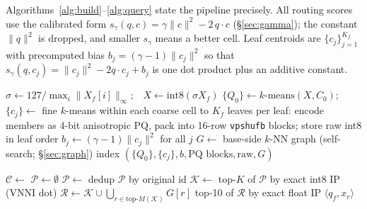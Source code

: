 \documentclass{article}
\begin{document}
Algorithms~\ref{alg:build}--\ref{alg:query} state the pipeline precisely. All
routing scores use the calibrated form $s_\gamma(q,c)=\gamma\lVert c\rVert^2-2\,
q\!\cdot\!c$ (\S\ref{sec:gamma}); the constant $\lVert q\rVert^2$ is dropped, and
smaller $s_\gamma$ means a better cell. Leaf centroids are $\{c_j\}_{j=1}^{K_f}$
with precomputed bias $b_j=(\gamma-1)\lVert c_j\rVert^2$ so that
$s_\gamma(q,c_j)=\lVert c_j\rVert^2-2q\!\cdot\!c_j+b_j$ is one dot product plus an
additive constant.

\begin{algorithm}[t]
\caption{Build}
\label{alg:build}
$\sigma \gets 127/\max_i\lVert X_f[i]\rVert_\infty$;\ \ $X \gets \mathrm{int8}(\sigma X_f)$
$\{Q_0\}\gets k\text{-means}(X,C_0)$;\ \ $\{c_j\}\gets$ fine $k$-means within each
  coarse cell to $K_f$ leaves\;
per leaf: encode members as 4-bit anisotropic PQ, pack into 16-row \texttt{vpshufb}
  blocks; store raw int8 in leaf order\;
$b_j \gets (\gamma-1)\lVert c_j\rVert^2$ for all $j$ 
$G \gets$ base-side $k$-NN graph (self-search; \S\ref{sec:graph})\;
\Return index $(\{Q_0\},\{c_j\},b,\text{PQ blocks},\text{raw},G)$\;
\end{algorithm}

\begin{algorithm}[t]
\caption{Route (tree descent) \textendash{} returns the $p$ best leaves}
\label{alg:route}
\end{algorithm}

\begin{algorithm}[t]
\caption{Query}
\label{alg:query}
$\mathcal{C}\gets$ \;
$\mathcal{P}\gets\emptyset$ 
$\mathcal{P}\gets$ dedup $\mathcal{P}$ by original id 
$\mathcal{K}\gets$ top-$K$ of $\mathcal{P}$ by exact int8 IP (VNNI dot) 
$\mathcal{R}\gets \mathcal{K}\cup\bigcup_{r\in\text{top-}M(\mathcal{K})} G[r]$
\Return top-10 of $\mathcal{R}$ by exact float IP $\langle q_f, x_r\rangle$\;
\end{algorithm}
\end{document}
